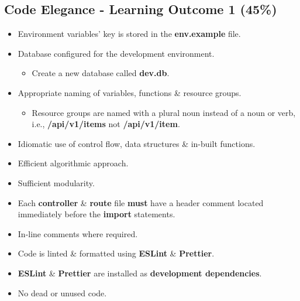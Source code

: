 \documentclass{article}
\begin{document}
\subsection*{Code Elegance - Learning Outcome 1 (45\%)}
\begin{itemize}
	\item Environment variables' key is stored in the \textbf{env.example} file. 
  \item Database configured for the development environment.
  \begin{itemize}
    \item Create a new database called \textbf{dev.db}. 
  \end{itemize}
  \item Appropriate naming of variables, functions \& resource groups.
  \begin{itemize}
	\item Resource groups are named with a plural noun instead of a noun or verb, i.e., \textbf{/api/v1/items} not \textbf{/api/v1/item}.
  \end{itemize}
	\item Idiomatic use of control flow, data structures \& in-built functions.
  \item Efficient algorithmic approach.
  \item Sufficient modularity.
  \item Each \textbf{controller} \& \textbf{route} file \textbf{must} have a header comment located immediately before the \textbf{import} statements.
\item In-line comments where required.
  \item Code is linted \& formatted using \textbf{ESLint} \& \textbf{Prettier}.
  \item \textbf{ESLint} \& \textbf{Prettier} are installed as \textbf{development dependencies}.	
\item No dead or unused code. 
\end{itemize}
\end{document}
